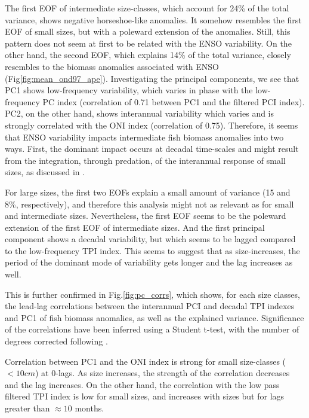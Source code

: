 The first EOF of intermediate size-classes, which account for 24\% of the total variance, shows negative horseshoe-like anomalies. It somehow resembles the first EOF of small sizes, but with a poleward extension of the anomalies. Still, this pattern does not seem at first to be related with the ENSO variability. On the other hand, the second EOF, which explains 14\% of the total variance, closely resembles to the biomass anomalies associated with ENSO (Fig\ref{fig:mean_ond97_ape}). Investigating the principal components, we see that PC1 shows low-frequency variability, which varies in phase with the low-frequency PC index (correlation of 0.71 between PC1 and the filtered PCI index). PC2, on the other hand, shows interannual variability which varies and is strongly correlated with the ONI index (correlation of 0.75). Therefore, it seems that ENSO variability impacts intermediate fish biomass anomalies into two ways. First, the dominant impact occurs at decadal time-scales and might result from the integration, through predation, of the interannual response of small sizes, as discussed in \cite{lorenzoDoubleintegrationHypothesisExplain2013}. 

For large sizes, the first two EOFs explain a small amount of variance (15 and 8\%, respectively), and therefore this analysis might not as relevant as for small and intermediate sizes. Nevertheless, the first EOF seems to be the poleward extension of the first EOF of intermediate sizes. And the first principal component shows a decadal variability, but which seems to be lagged compared to the low-frequency TPI index. This seems to suggest that as size-increases, the period of the dominant mode of variability gets longer and the lag increases as well.

This is further confirmed in Fig.\ref{fig:pc_corrs}, which shows, for each size classes, the lead-lag correlations between the interannual PCI and decadal TPI indexes and PC1 of fish biomass anomalies, as well as the explained variance. Significance of the correlations have been inferred using a Student t-test, with the number of degrees corrected following \cite{brethertonEffectiveNumberSpatial1999}.

Correlation between PC1 and the ONI index is strong for small size-classes ($<10 cm$) at 0-lags. As size increases, the strength of the correlation decreases and the lag increases. On the other hand, the correlation with the low pass filtered TPI index is low for small sizes, and increases with sizes but for lags greater than $\approx 10$ months.

